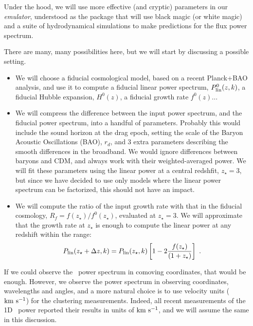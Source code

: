 Under the hood, we will use more effective (and cryptic) parameters in our 
\textit{emulator}, understood as the package that will use black magic 
(or white magic) and a suite of hydrodynamical simulations to make 
predictions for the flux power spectrum.

There are many, many possibilities here, but we will start by discussing a 
possible setting. 

\begin{itemize}
 \item We will choose a fiducial cosmological model, based on a recent 
  Planck+BAO analysis, and use it to compute a fiducial linear power spectrum,
  $P_{\rm lin}^0(z,k)$, a fiducial Hubble expansion, $H^0(z)$, a fiducial growth 
  rate $f^0(z)$...
 \item We will compress the difference between the input power spectrum, 
  and the fiducial power spectrum, into a handful of parameters. 
  Probably this would include the sound horizon at the drag epoch, setting 
  the scale of the Baryon Acoustic Oscillations (BAO), $r_d$, and 3 extra 
  parameters describing the smooth differences in the broadband.
  We would ignore differences between baryons and CDM, and always work with 
  their weighted-averaged power. 
  We will fit these parameters using the linear power at a central redshfit,
  $z_\star=3$, but since we have decided to use only models where the 
  linear power spectrum can be factorized, this should not have an impact.
 \item We will compute the ratio of the input growth rate with that in the 
  fiducial cosmology, $R_f = f(z_\star)/f^0(z_\star)$, evaluated at 
  $z_\star=3$. 
  We will approximate that the growth rate at $z_\star$ is enough to compute 
  the linear power at any redshift within the range:
  \begin{equation}
   P_{\rm lin}(z_\star+\Delta z,k) = P_{\rm lin}(z_\star,k) \left[ 1 
      - 2 \frac{f(z_\star)}{(1+z_\star)} \right] ~. 
  \end{equation} 
\end{itemize}

If we could observe the \lya\ power spectrum in comoving coordinates, that 
would be enough. 
However, we observe the power spectrum in observing coordinates, wavelengths
and angles, and a more natural choice is to use velocity units (${\rm km~s^{-1}}$) for 
the clustering measurements. 
Indeed, all recent measurements of the 1D \lya\ power reported their results
in units of ${\rm km~s^{-1}}$, and we will assume the same in this discussion.




